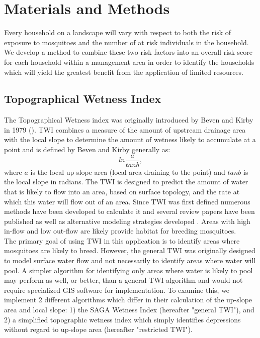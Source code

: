 \documentclass[10pt,letterpaper]{article}\usepackage[]{graphicx}\usepackage[]{color}
\begin{document}
\section*{Materials and Methods}%
Every household on a landscape will vary with respect to both the risk of exposure to mosquitoes and the number of at risk individuals in the household. We develop a method to combine these two risk factors into an overall risk score for each household within a management area in order to identify the households which will yield the greatest benefit from the application of limited resources.\\

\subsection{Topographical Wetness Index}

The Topographical Wetness index was originally introduced by Beven and Kirby in 1979 (\cite{Beven1979}).  TWI combines a measure of the amount of upstream drainage area with the local slope to determine the amount of wetness likely to accumulate at a point and is defined by Beven and Kirby generally as:
$$ln\frac{a}{tanb},$$
where $a$ is the local up-slope area (local area draining to the point) and $tanb$ is the local slope in radians.  The TWI is designed to predict the amount of water that is likely to flow into an area, based on surface topology, and the rate at which this water will flow out of an area.  Since TWI was first defined numerous methods have been developed to calculate it and several review papers have been published \cite{Quinn1995,Sørensen2006} as well as alternative modeling strategies developed \cite{Grabs2009}.  Areas with high in-flow and low out-flow are likely provide habitat for breeding mosquitoes. \\

The primary goal of using TWI in this application is to identify areas where mosquitoes are likely to breed.  However, the general TWI was originally designed to model surface water flow and not necessarily to identify areas where water will pool. A simpler algorithm for identifying only areas where water is likely to pool may perform as well, or better, than a general TWI algorithm and would not require specialized GIS software for implementation.  To examine this, we implement 2 different algorithms which differ in their calculation of the up-slope area and local slope: 1) the SAGA Wetness Index \cite{Bohner2002} (hereafter "general TWI"), and 2) a simplified topographic wetness index which simply identifies depressions without regard to up-slope area (hereafter "restricted TWI").  \\
\end{document}
